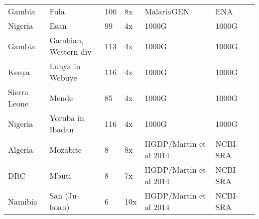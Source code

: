 \begin{landscape}
\begin{longtable}{lllllll}
Gambia & Fula & 100 & 8x & MalariaGEN & ENA \\
Nigeria & Esan & 99 & 4x & 1000G & 1000G \\
Gambia & Gambian, Western div & 113 & 4x & 1000G & 1000G \\
Kenya & Luhya in Webuye & 116 & 4x & 1000G & 1000G \\
Sierra Leone & Mende & 85 & 4x & 1000G & 1000G \\
Nigeria & Yoruba in Ibadan & 116 & 4x & 1000G & 1000G \\
Algeria & Mozabite & 8 & 8x & HGDP/Martin et al 2014 & NCBI-SRA \\
DRC & Mbuti & 8 & 7x & HGDP/Martin et al 2014 & NCBI-SRA \\
Namibia & San (Ju-hoan) & 6 & 10x & HGDP/Martin et al 2014 & NCBI-SRA \\

\end{longtable}
\end{landscape}
